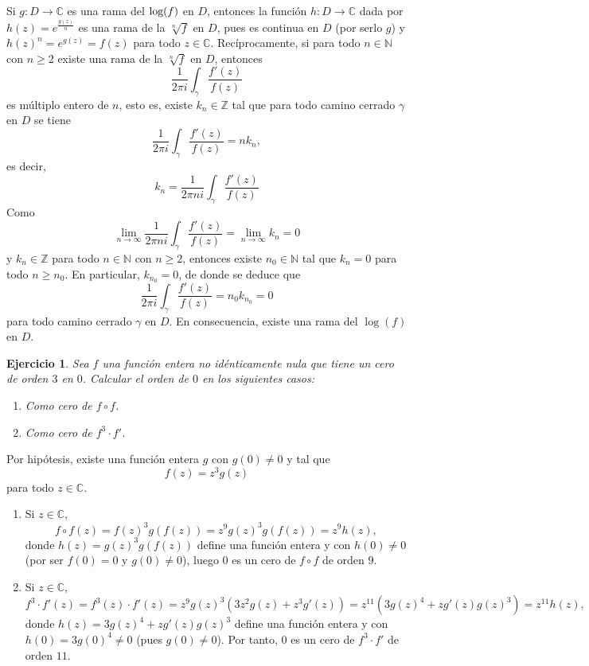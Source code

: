 \documentclass[11pt]{report}
\makeatletter
\renewenvironment{proof}[1][\proofname]{\par
  \pushQED{\qed}%
  \normalfont \topsep\z@skip %
  \trivlist
  \item[\hskip\labelsep
        \itshape
    #1\@addpunct{.}]\ignorespaces
}{%
  \popQED\endtrivlist\@endpefalse
}
\newcommand{\N}{\mathbb N}
\newcommand{\Z}{\mathbb Z}
\newcommand{\C}{\mathbb C}
\newtheorem{ejercicio}{Ejercicio}
\makeatother
\begin{document}
\begin{proof}
  Si $g \colon D \to \C$ es una rama del $\textup{log}(f)$ en $D$, entonces la función $h \colon D \to \C$ dada por $h(z) = e^{\frac{g(z)}{n}}$ es una rama de la $\sqrt[n]{f}$ en $D$, pues es continua en $D$ (por serlo $g$) y $h(z)^n = e^{g(z)} = f(z)$ para todo $z \in \C$. Recíprocamente, si para todo $n \in \N$ con $n \geq 2$ existe una rama de la $\sqrt[n]{f}$ en $D$, entonces
  \[\frac{1}{2\pi i}  \int_{\gamma} \frac{f'(z)}{f(z)}\]
  es múltiplo entero de $n$, esto es, existe $k_n \in \Z$ tal que para todo camino cerrado $\gamma$ en $D$ se tiene
  \[\frac{1}{2\pi i}  \int_{\gamma} \frac{f'(z)}{f(z)} = nk_n,\]
  es decir,
  \[k_n = \frac{1}{2\pi ni}  \int_{\gamma} \frac{f'(z)}{f(z)}\]
  Como
  \[\lim_{n \to \infty}\frac{1}{2\pi ni}  \int_{\gamma} \frac{f'(z)}{f(z)} = \lim_{n \to \infty}k_n =0\]
  y $k_n \in \Z$ para todo $n \in \N$ con $n \geq 2$, entonces existe $n_0 \in \N$ tal que $k_n = 0$ para todo $n \geq n_0$. En particular, $k_{n_0} = 0$, de donde se deduce que
  \[\frac{1}{2\pi i}  \int_{\gamma} \frac{f'(z)}{f(z)} = n_0k_{n_0} = 0\]
  para todo camino cerrado $\gamma$ en $D$. En consecuencia, existe una rama del $\log(f)$ en $D$.
\end{proof}

\begin{ejercicio}
  Sea $f$ una función entera no idénticamente nula que tiene un cero de orden $3$ en $0$. Calcular el orden de $0$ en los siguientes casos:
    \begin{enumerate}
      \item Como cero de $f \circ f$.
      \item Como cero de $f^3 \cdot f'$.
    \end{enumerate}
\end{ejercicio}

\begin{proof}
Por hipótesis, existe una función entera $g$ con $g(0)\neq 0$ y tal que
\[f(z)=z^3g(z)\]
para todo $z \in \C$.
\begin{enumerate}
  \item Si $z \in \C$,
  \[f \circ f (z)=f(z)^3g (f(z)) = z^9g(z)^3g( f(z)) = z^9h(z),\]
  donde $h(z) = g(z)^3g( f(z))$ define una función entera y con $h(0) \neq 0$ (por ser $f(0)=0$ y $g(0) \neq 0$), luego $0$ es un cero de $f \circ f$ de orden $9$.
  \item Si $z \in \C$,
  \[f^3 \cdot f'(z) = f^3(z) \cdot f'(z) = z^{9}g(z)^3\left(3z^2g(z)+z^3g'(z)\right) =z^{11}\left(3g(z)^4+zg'(z)g(z)^3\right) = z^{11}h(z),\]
  donde $h(z)=3g(z)^4+zg'(z)g(z)^3$ define una función entera y con $h(0)=3g(0)^4 \neq 0$ (pues $g(0) \neq 0$). Por tanto, $0$ es un cero de $f^3 \cdot f'$ de orden $11$. \qedhere
\end{enumerate}
\end{proof}
\end{document}
